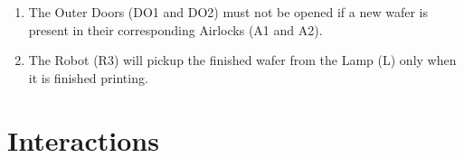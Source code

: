 \documentclass[a4paper,12pt]{article}
\begin{document}
\begin{enumerate}
\item The Outer Doors (DO1 and DO2) must not be opened if a new wafer is present in their corresponding Airlocks (A1 and A2).

\item The Robot (R3) will pickup the finished wafer from the Lamp (L) only when it is finished printing.




\end{enumerate}

\newpage
\section{Interactions} 
\end{document}
